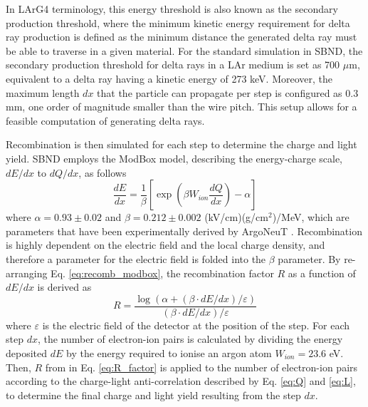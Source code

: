 In LArG4 terminology, this energy threshold is also known as the secondary production threshold, where the minimum kinetic energy requirement for delta ray production is defined as the minimum distance the generated delta ray must be able to traverse in a given material. 
For the standard simulation in SBND, the secondary production threshold for delta rays in a LAr medium is set as 700 $\mu$m, equivalent to a delta ray having a kinetic energy of 273 keV.
Moreover, the maximum length $dx$ that the particle can propagate per step is configured as 0.3 mm, one order of magnitude smaller than the wire pitch.
This setup allows for a feasible computation of generating delta rays.

Recombination is then simulated for each step to determine the charge and light yield.
SBND employs the ModBox model, describing the energy-charge scale, $dE/dx$ to $dQ/dx$, as follows
\begin{equation}
	\label{eq:recomb_modbox}
	\frac{dE}{dx} = \frac{1}{\beta}\left[ \exp{\left( \beta W_{ion}  \frac{dQ}{dx}\right)} -\alpha \right]
\end{equation}
where $\alpha = 0.93\pm0.02$ and $\beta = 0.212\pm0.002$ (kV/cm)(g/cm$^{2}$)/MeV, which are parameters that have been experimentally derived by ArgoNeuT \cite{argoneut_recomb}.
Recombination is highly dependent on the electric field and the local charge density, and therefore a parameter for the electric field is folded into the $\beta$ parameter.
By re-arranging Eq. \ref{eq:recomb_modbox}, the recombination factor $R$ as a function of $dE/dx$ is derived as
\begin{equation}
	\label{eq:R_factor}
	R = \frac{\log{ \left( \alpha + \left(\beta \cdot dE/dx\right)/\varepsilon \right)}}{\left(\beta \cdot dE/dx\right)/\varepsilon} 
\end{equation}
where $\varepsilon$ is the electric field of the detector at the position of the step.
For each step $dx$, the number of electron-ion pairs is calculated by dividing the energy deposited $dE$ by the energy required to ionise an argon atom $W_{ion} = 23.6$ eV. 
Then, $R$ from in Eq. \ref{eq:R_factor} is applied to the number of electron-ion pairs according to the charge-light anti-correlation described by Eq. \ref{eq:Q} and \ref{eq:L}, to determine the final charge and light yield resulting from the step $dx$.

